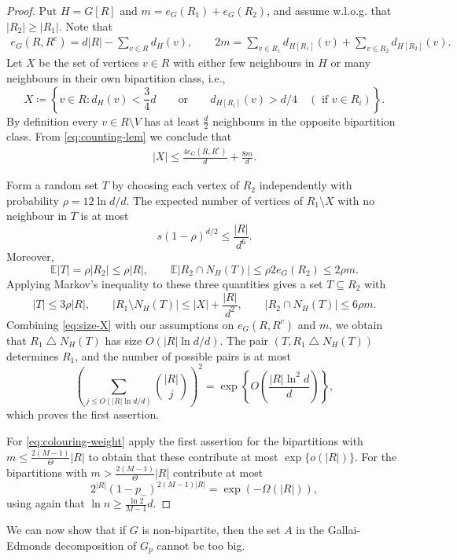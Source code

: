 \documentclass[notitlepage]{scrartcl}
\begin{document}
\begin{proof}
Put $H=G[R]$ and $m=e_G(R_1)+e_G(R_2)$, and assume w.l.o.g. that $|R_2|\ge|R_1|$.
Note that
\begin{align} \label{eq:counting-lem}
   e_G(R, R^c)=d|R|- \sum_{v \in R} d_H(v), \qquad 2m= \sum_{v \in R_1} d_{H[R_1]} (v) + \sum_{v \in R_2} d_{H[R_2]}(v). 
\end{align}
Let $X$ be the set of vertices $v \in R$ with either few neighbours in $H$ or many neighbours in their own bipartition class, i.e.,
\[
 X\coloneqq \left\{v \in R: d_H(v)<\frac{3}{4}d \qquad\text{or}\qquad  d_{H[R_i]}(v)>d/4\quad( \text{ if } v\in R_i)\right\}.
\]
By definition every $v \in R\setminus V$ has at least $\frac{d}{2}$ neighbours in the opposite bipartition class.
From \eqref{eq:counting-lem} we conclude that
\begin{align} \label{eq:size-X}
    |X| \leq \frac{4 e_G(R, R^c)}{d} + \frac{8m}{d}.
\end{align}

Form a random set $T$ by choosing each vertex of $R_2$ independently with probability $\rho=12\ln d/d$. The expected number of vertices of $R_1\setminus X$ with no neighbour in $T$ is at most
\[
 s(1-\rho)^{d/2}\le \frac{|R|}{d^6}.
\]
Moreover,
\[
 \mathbb{E}|T|= \rho |R_2| \le\rho |R|,
 \qquad
 \mathbb{E}|R_2\cap N_H(T)|\le\rho 2 e_G(R_2)\le2\rho m.
\]
Applying Markov's inequality to these three quantities gives a set $T\subseteq R_2$ with
\[
 |T|\le3\rho |R|,
 \qquad
 |R_1\setminus N_H(T)|\le |X| + \frac{|R|}{d^2},
 \qquad
 |R_2\cap N_H(T)|\le6\rho m.
\]
Combining \eqref{eq:size-X} with our assumptions on $e_G(R, R^c)$ and $m$, we obtain that $R_1\mathbin{\triangle}N_H(T)$ has size $O(|R|\ln d/d)$.
The pair $(T, R_1\mathbin{\triangle}N_H(T))$ determines $R_1$, and the number of possible pairs is at most
\[
 \left(\sum_{j \le O(|R|\ln d/d)}\binom{|R|}{j}\right)^2
 =\exp\left\{O\left(\frac{|R|\ln^2 d}{d}\right)\right\},
\]
which proves the first assertion.

For \eqref{eq:colouring-weight} apply the first assertion for the bipartitions with $m\le \frac{2(M-1)}{\Theta} |R|$ to obtain that these contribute at most $\exp\{o(|R |)\}$. For the bipartitions with $m>\frac{2(M-1)}{ \Theta} |R|$ contribute at most
\[
 2^{|R|} (1-p_-)^{2 (M-1) |R|}=\exp\left(- \Omega(|R|) \right),
\]
using again that $\ln n \geq \frac{\ln 2}{M-1} d$.
\end{proof}
We can now show that if $G$ is non-bipartite, then the set $A$ in the Gallai-Edmonds decomposition of $G_p$ cannot be too big.
\end{document}
